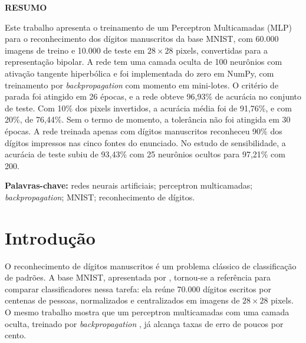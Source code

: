 \documentclass[12pt,a4paper]{article}
\begin{document}
\fazcapa
\fazfolhaderosto

\thispagestyle{empty}
\begin{center}\textbf{RESUMO}\end{center}
\vspace{2pt}
\begin{singlespace}
\noindent
Este trabalho apresenta o treinamento de um Perceptron Multicamadas (MLP) para o
reconhecimento dos dígitos manuscritos da base MNIST, com 60.000 imagens de treino e 10.000
de teste em $28\times28$ pixels, convertidas para a representação bipolar. A rede tem uma
camada oculta de 100 neurônios com ativação tangente hiperbólica e foi implementada do
zero em NumPy, com treinamento por \textit{backpropagation} com momento em mini-lotes. O
critério de parada foi atingido em 26 épocas, e a rede obteve 96,93\% de acurácia no
conjunto de teste. Com 10\% dos pixels invertidos, a acurácia média foi de 91,76\%, e com
20\%, de 76,44\%. Sem o termo de momento, a tolerância não foi atingida em 30 épocas. A rede
treinada apenas com dígitos manuscritos reconheceu 90\% dos dígitos impressos nas cinco
fontes do enunciado. No estudo de sensibilidade, a acurácia de teste subiu de 93,43\% com
25 neurônios ocultos para 97,21\% com 200.

\vspace{6pt}
\noindent\textbf{Palavras-chave:} redes neurais artificiais; perceptron multicamadas;
\textit{backpropagation}; MNIST; reconhecimento de dígitos.
\end{singlespace}
\newpage

\thispagestyle{empty}
\renewcommand{\contentsname}{\centering SUMÁRIO}
\begin{singlespace}
\tableofcontents
\end{singlespace}
\newpage

\pagestyle{abnt}

\section{Introdução}

O reconhecimento de dígitos manuscritos é um problema clássico de classificação de
padrões. A base MNIST, apresentada por , tornou-se a referência para
comparar classificadores nessa tarefa: ela reúne 70.000 dígitos escritos por centenas de
pessoas, normalizados e centralizados em imagens de $28\times28$ pixels. O mesmo trabalho
mostra que um perceptron multicamadas com uma camada oculta, treinado por
\textit{backpropagation} \cite{rumelhart1986}, já alcança taxas de erro de poucos por cento.
\end{document}
